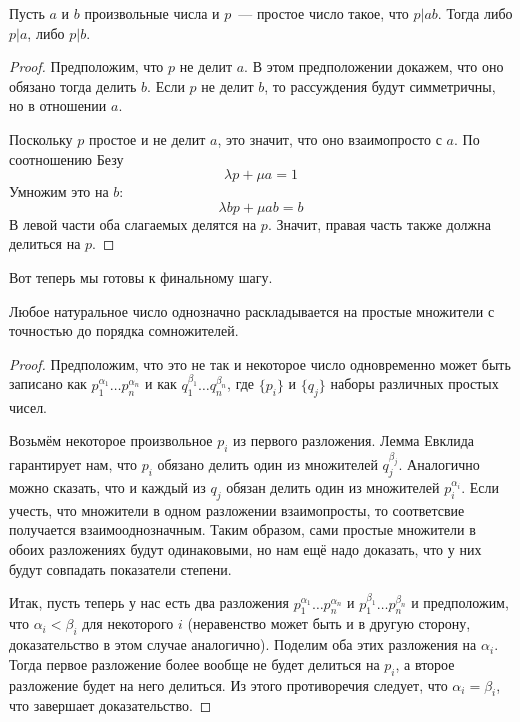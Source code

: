 \begin{EuclidsLemma}
Пусть $a$ и $b$ произвольные числа и $p$~--- простое число такое, что $p|ab$. Тогда либо $p|a$, либо $p|b$.
\end{EuclidsLemma}
\begin{proof}
Предположим, что $p$ не делит $a$. В этом предположении докажем, что оно обязано тогда делить $b$. Если $p$ не делит $b$, то рассуждения будут симметричны, но в отношении $a$.

Поскольку $p$ простое и не делит $a$, это значит, что оно взаимопросто с $a$. По соотношению Безу
$$\lambda p + \mu a = 1$$
Умножим это на $b$:
$$ \lambda bp + \mu ab = b$$
В левой части оба слагаемых делятся на $p$. Значит, правая часть также должна делиться на $p$.
\end{proof}

Вот теперь мы готовы к финальному шагу.

\begin{FTA}
Любое натуральное число однозначно раскладывается на простые множители с точностью до порядка сомножителей.
\end{FTA}
\begin{proof}
Предположим, что это не так и некоторое число одновременно может быть записано как $p_1^{\alpha_1}\ldots p_n^{\alpha_n}$ и как $q_1^{\beta_1}\ldots q_n^{\beta_n}$, где $\{p_i\}$ и $\{q_j\}$ наборы различных простых чисел.

Возьмём некоторое произвольное $p_i$ из первого разложения. Лемма Евклида гарантирует нам, что $p_i$ обязано делить один из множителей $q_j^{\beta_j}$. Аналогично можно сказать, что и каждый из $q_j$ обязан делить один из множителей $p_i^{\alpha_i}$. Если учесть, что множители в одном разложении взаимопросты, то соответсвие получается взаимооднозначным. Таким образом, сами простые множители в обоих разложениях будут одинаковыми, но нам ещё надо доказать, что у них будут совпадать показатели степени.

Итак, пусть теперь у нас есть два разложения $p_1^{\alpha_1}\ldots p_n^{\alpha_n}$ и $p_1^{\beta_1}\ldots p_n^{\beta_n}$ и предположим, что $\alpha_i < \beta_i$ для некоторого $i$ (неравенство может быть и в другую сторону, доказательство в этом случае аналогично). Поделим оба этих разложения на $\alpha_i$. Тогда первое разложение более вообще не будет делиться на $p_i$, а второе разложение будет на него делиться. Из этого противоречия следует, что $\alpha_i=\beta_i$, что завершает доказательство.
\end{proof}

